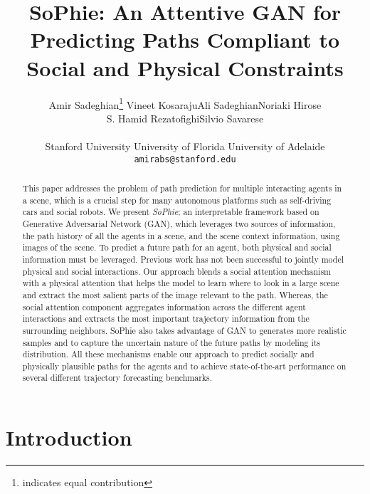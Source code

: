 \documentclass[10pt,twocolumn,letterpaper]{article}
\newcommand*\samethanks[1][\value{footnote}]{\footnotemark[#1]}
\begin{document}
\title{SoPhie: An Attentive GAN for Predicting Paths Compliant to Social and Physical Constraints}



\author{Amir Sadeghian\thanks{indicates equal contribution} \quad Vineet Kosaraju\samethanks \quad Ali Sadeghian\quad Noriaki Hirose \\
S. Hamid Rezatofighi\quad Silvio Savarese\\
    \\
    \normalsize Stanford University \quad    University of Florida \quad   University of Adelaide\\
    {\tt\small amirabs@stanford.edu}
}

\maketitle


\begin{abstract}
This paper addresses the problem of path prediction for multiple interacting agents in a scene, which is a crucial step for many autonomous platforms such as self-driving cars and social robots. We present \textit{SoPhie}; an interpretable framework based on Generative Adversarial Network (GAN), which leverages two sources of information, the path history of all the agents in a scene, and the scene context information, using images of the scene. To predict a future path for an agent, both physical and social information must be leveraged. Previous work has not been successful to jointly model physical and social interactions. Our approach blends a social attention mechanism with a physical attention that helps the model to learn where to look in a large scene and extract the most salient parts of the image relevant to the path. Whereas, the social attention component aggregates information across the different agent interactions and extracts the most important trajectory information from the surrounding neighbors.
SoPhie also takes advantage of GAN to generates more realistic samples and to capture the uncertain nature of the future paths by modeling its distribution. All these mechanisms enable our approach to predict socially and physically plausible paths for the agents and to achieve state-of-the-art performance on several different trajectory forecasting benchmarks. 
\end{abstract}

\section{Introduction}
\label{sec:Introduction}
\end{document}
